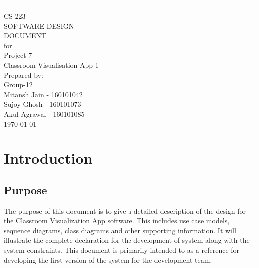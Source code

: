 \documentclass{scrreprt}
\date{}
\title{}
\begin{document}
\begin{flushright}
    \rule{16cm}{5pt}\vskip1cm
    \begin{bfseries}
        \Huge{CS-223\\SOFTWARE DESIGN\\ DOCUMENT}\\
        \vspace{1.5cm}
        for\\
        \vspace{1.5cm}
        Project 7\\
        Classroom Visualisation App-1\\
        
        \vspace{1.9cm}
        \LARGE{Prepared by: }\\
        Group-12\\
        Mitansh Jain - 160101042\\
        Sujoy Ghosh - 160101073\\
        Akul Agrawal - 160101085\\
        \vspace{1.9cm}
        \today\\
    \end{bfseries}
\end{flushright}
\tableofcontents
\listoftables
\chapter{Introduction}

\section{Purpose}
The purpose of this document is to give a detailed description of the
design for the Classroom Visualization App software. This includes use
case models, sequence diagrams, class diagrams and other supporting
information. It will illustrate the complete declaration for the
development of system along with the system constraints. This document
is primarily intended to as a reference for developing the first version
of the system for the development team.
\end{document}
